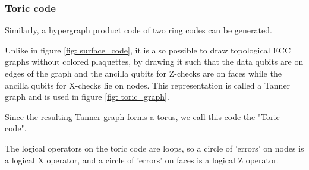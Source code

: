 \subsubsection{Toric code}
Similarly, a hypergraph product code of two ring codes can be 
generated. 

Unlike in figure \ref{fig: surface_code}, it is also possible to draw topological
ECC graphs without colored plaquettes, by drawing it such that the data qubits are on 
edges of the graph and the ancilla qubits for Z-checks are on faces
while the ancilla qubits for X-checks lie on nodes.
This representation is called a Tanner graph \cite{tillichzemor}
and is used in figure \ref{fig: toric_graph}.

Since the resulting Tanner graph forms a torus,
we call this code the "Toric code".

The logical operators on the toric code are loops, so a circle of 
'errors' on nodes is a logical X operator, and a circle of 'errors'
on faces is a logical Z operator.

